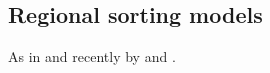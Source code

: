 \documentclass[fleqn,10pt]{SelfArx} %
\begin{document}
\subsection{Regional sorting models}

As in \citet{Bayer2004, Bayer2007a} and recently by \citet{Wang2016} and \citet{Bernasco2016}.



\printbibliography

\end{document}
